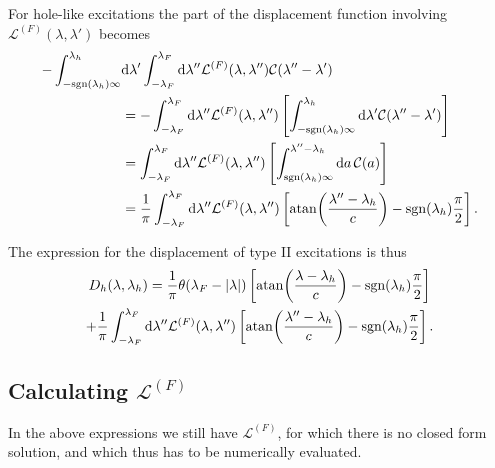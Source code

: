 \documentclass[11pt, a4paper]{report} %
\newcommand{\inversetruncc}{\mathcal{L}}
\newcommand{\kernel}{\mathcal{C}}
\begin{document}
For hole-like excitations the part of the displacement function involving \(\inversetruncc^{(F)}(\lambda,\lambda')\) becomes
\begin{align}
	 - \int_{-\textrm{sgn}(\lambda_h)\infty}^{\lambda_h} &\dd \lambda' \int_{-\lambda_F}^{\lambda_F} \dd \lambda''  \inversetruncc^{(F)}(\lambda,\lambda'') \kernel(\lambda''-\lambda')\\
	 &= - \int_{-\lambda_F}^{\lambda_F} \dd \lambda''  \inversetruncc^{(F)}(\lambda,\lambda'')\left[ \int_{-\textrm{sgn}(\lambda_h)\infty}^{\lambda_h} \dd \lambda' \kernel(\lambda''-\lambda')\right]\\
	 &= \int_{-\lambda_F}^{\lambda_F} \dd \lambda''  \inversetruncc^{(F)}(\lambda,\lambda'')\left[ \int_{\textrm{sgn}(\lambda_h)\infty}^{\lambda''-\lambda_h} \dd a \, \kernel(a)\right]\\
	 &= \frac{1}{\pi}\int_{-\lambda_F}^{\lambda_F} \dd  \lambda''  \inversetruncc^{(F)}(\lambda,\lambda'')\left[ \atan(\frac{\lambda''-\lambda_h}{c}) - \textrm{sgn}(\lambda_h)\frac{\pi}{2}\right].
\end{align}

The expression for the displacement of type II excitations is thus
\begin{multline}
	D_h(\lambda, \lambda_h) = \frac{1}{\pi}\theta(\lambda_F - \lvert \lambda \rvert) \left[ \atan(\frac{\lambda-\lambda_h}{c}) - \textrm{sgn}(\lambda_h)\frac{\pi}{2}\right] \\+
	\frac{1}{\pi}\int_{-\lambda_F}^{\lambda_F} \dd  \lambda''  \inversetruncc^{(F)}(\lambda,\lambda'')\left[ \atan(\frac{\lambda''-\lambda_h}{c}) - \textrm{sgn}(\lambda_h)\frac{\pi}{2}\right].
\end{multline}

\subsection{Calculating \(\inversetruncc^{(F)}\)}

In the above expressions we still have \(\inversetruncc^{(F)}\), for which there is no closed form solution, and which thus has to be numerically evaluated.
\end{document}
